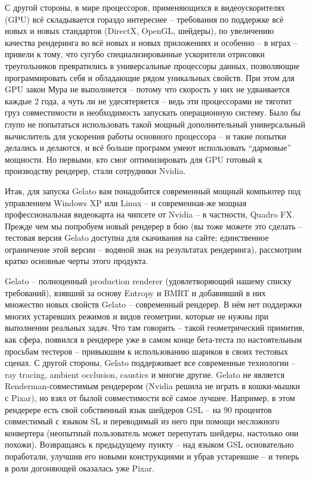 С другой стороны, в мире процессоров, применяющихся
    в видеоускорителях (GPU) всё складывается гораздо интереснее –
    требования по поддержке всё новых и новых стандартов (DirectX,
    OpenGL, шейдеры), по увеличению качества рендеринга во всё новых и
    новых приложениях и особенно – в играх – привели к тому, что сугубо
    специализированные ускорители отрисовки треугольников превратились
    в универсальные процессоры данных, позволяющие программировать себя
    и обладающие рядом уникальных свойств. При этом для GPU закон Мура
    не выполняется – потому что скорость у них не удваивается каждые 2
    года, а чуть ли не удесятеряется – ведь эти процессорами не тяготит
    груз совместимости и необходимость запускать операционную систему.
    Было бы глупо не попытаться использовать такой мощный
    дополнительный универсальный вычислитель для ускорения работы
    основного процессора – и такие попытки делались и делаются, и всё
    больше программ умеют использовать “дармовые” мощности. Но первыми,
    кто смог оптимизировать для GPU готовый к производству рендерер,
    стали сотрудники Nvidia.
  

 Итак, для запуска Gelato вам понадобится
    современный мощный компьютер под управлением Windows XP или Linux –
    и современная-же мощная профессиональная видеокарта на чипсете от
    Nvidia – в частности, Quadro FX. Прежде чем мы попробуем новый
    рендерер в бою (вы тоже можете это сделать – тестовая версия Gelato
    доступна для скачивания на сайте; единственное ограничение этой
    версии – водяной знак на результатах рендеринга), рассмотрим кратко
    основные черты этого продукта.
  
     Gelato – полноценный production renderer
      (удовлетворяющий нашему списку требований), взявший за основу
      Entropy и BMRT и добавивший в них множество новых
      свойств
     Gelato – современный рендерер. В нём нет поддержки
      многих устаревших режимов и видов геометрии, которые не нужны при
      выполнении реальных задач. Что там говорить – такой геометрический
      примитив, как сфера, появился в рендерере уже в самом конце
      бета-теста по настоятельным просьбам тестеров – привыкшим к
      использованию шариков в своих тестовых сценах. С другой стороны,
      Gelato поддерживает все современные технологии – ray tracing,
      ambient occlusion, caustics и многие другие.
     Gelato не является Renderman-совместимым рендерером
      (Nvidia решила не играть в кошки-мышки с Pixar),  но взял от былой совместимости
      всё самое лучшее. Например, в этом рендерере есть свой собственный
      язык шейдеров GSL – на 90 процентов совместимый с языком SL и
      переводимый из него при помощи несложного конвертера (неопытный
      пользователь может перепутать шейдеры, настолько они похожи).
      Возвращаясь к предыдущему пункту – над языком GSL основательно
      поработали, улучшив его новыми конструкциями и убрав устаревшие – и
      теперь в роли догоняющей оказалась уже Pixar.
  
